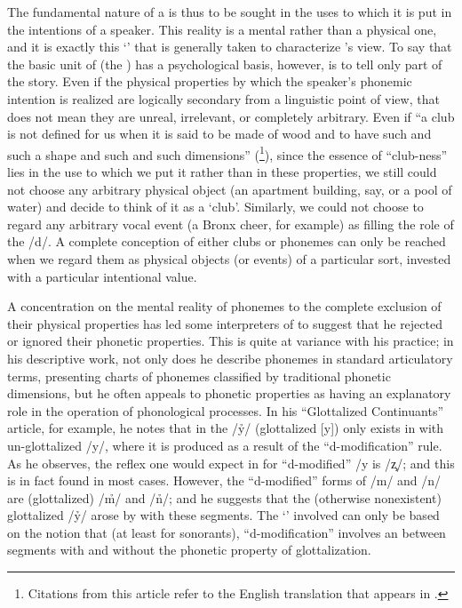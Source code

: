 The fundamental nature of a  is thus to be sought in the
uses to which it is put in the intentions of a speaker. This reality
is a mental rather than a physical one, and it is exactly this
`' that is generally taken to characterize {\Sapir}'s view. To
say that the basic unit of  (the ) has a
psychological basis, however, is to tell only part of the story. Even
if the physical properties by which the speaker's phonemic intention
is realized are logically secondary from a linguistic point of view,
that does not mean they are unreal, irrelevant, or completely
arbitrary. Even if ``a club is not defined for us when it is said to be
made of wood and to have such and such a shape and such and such
dimensions'' (\citealt[46]{sapir33:reality}\footnote{Citations from
  this article refer to the {English} translation that appears in
  \citealt[pp. 46--60]{sapir49:selected.writings}.}), since the
essence of ``club-ness'' lies in the use to which we put it rather than
in these properties, we still could not choose any arbitrary physical
object (an apartment building, say, or a pool of water) and decide to
think of it as a `club'. Similarly, we could not choose to regard any
arbitrary vocal event (a Bronx cheer, for example) as filling the role
of the   /d/. A complete conception of either clubs or
phonemes can only be reached when we regard them as physical objects
(or events) of a particular sort, invested with a particular
intentional value.

A concentration on the mental reality of phonemes to the complete
exclusion of their physical properties has led some interpreters of
{\Sapir} to suggest that he rejected or ignored their phonetic
properties. This is quite at variance with his practice; in his
descriptive work, not only does he describe phonemes in standard
articulatory terms, presenting charts of phonemes classified by
traditional phonetic dimensions, but he often appeals to phonetic
properties as having an explanatory role in the operation of
phonological processes. In his ``Glottalized Continuants'' article, for
example, he notes \citep[251ff.]{sapir38:glottalized.continuants} that in
 the  /ỷ/ (glottalized [y]) only exists in 
with un-glottalized /y/, where it is produced as a result of the
``d-modification'' rule. As he observes, the reflex one would expect in
 for ``d-modified'' /y is /z̧/; and this is in fact found in most
cases. However, the  ``d-modified'' forms of /m/ and /n/ are
(glottalized) /m̉/ and /n̉/; and he suggests that the (otherwise
nonexistent) glottalized /ỷ/ arose by  with these segments. The
`' involved can only be based on the notion that (at least for
sonorants), ``d-modification'' involves an  between segments
with and without the phonetic property of glottalization.


